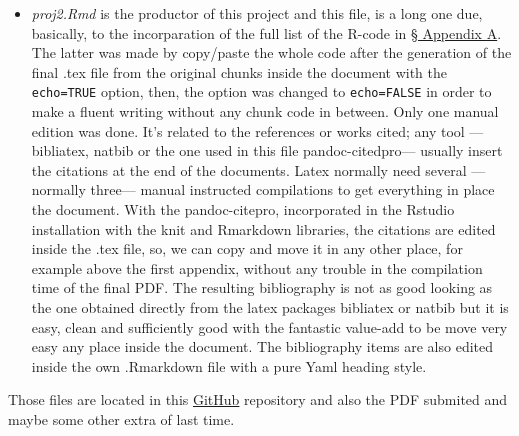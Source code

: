 \documentclass[12pt,spanish, american,b4paper, onecolumn, lmargin=1cm, rmargin=1cm, tmargin=1cm, bmargin=2cm,]{article}
\begin{document}
\begin{itemize}
\itemsep1pt\parskip0pt
\item
  \emph{proj2.Rmd} is the productor of this project and this file, is a
  long one due, basically, to the incorparation of the full list of the
  R-code in \hyperref[appendix-a]{§ Appendix A}. The latter was made by
  copy/paste the whole code after the generation of the final .tex file
  from the original chunks inside the document with the
  \texttt{echo=TRUE} option, then, the option was changed to
  \texttt{echo=FALSE} in order to make a fluent writing without any
  chunk code in between. \newline{}Only one manual edition was done.
  It's related to the references or works cited; any tool ---bibliatex,
  natbib or the one used in this file pandoc-citedpro--- usually insert
  the citations at the end of the documents. Latex normally need several
  ---normally three--- manual instructed compilations to get everything
  in place the document. With the pandoc-citepro, incorporated in the
  Rstudio installation with the knit and Rmarkdown libraries, the
  citations are edited inside the .tex file, so, we can copy and move it
  in any other place, for example above the first appendix, without any
  trouble in the compilation time of the final PDF. The resulting
  bibliography is not as good looking as the one obtained directly from
  the latex packages bibliatex or natbib but it is easy, clean and
  sufficiently good with the fantastic value-add to be move very easy
  any place inside the document.\newline{} The bibliography items are
  also edited inside the own .Rmarkdown file with a pure Yaml heading
  style.
\end{itemize}

Those files are located in this
\href{https://github.com/EduardoDiezBaez/RepData_PeerAssessment2}{GitHub}
repository and also the PDF submited and maybe some other extra of last
time.
\end{document}
